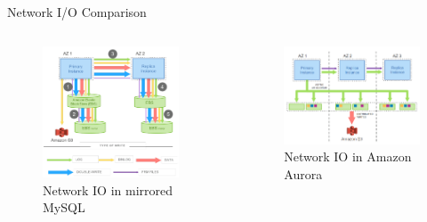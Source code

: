     \begin{frame}{Network I/O Comparison}
      \vspace{-6mm}
      \begin{columns}
        \begin{figure}[t]
          \includegraphics[width=0.9\textwidth]{../images/sql_networkio.png}
          \caption{Network IO in mirrored MySQL}
          \centering
        \end{figure}
        \pause
        \begin{figure}[t]
          \includegraphics[width=\textwidth]{../images/aurora_networkio.png}
          \caption{Network IO in Amazon Aurora}
          \centering
        \end{figure}
      \end{columns}
    \end{frame}

